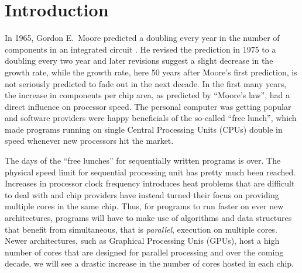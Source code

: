 \documentclass[11pt]{book}
\begin{document}
\chapter{Introduction}
In 1965, Gordon E.\ Moore predicted a doubling every year in the
number of components in an integrated circuit \cite{moore1965}. He
revised the prediction in 1975 to a doubling every two year
\cite{moore1975} and later revisions suggest a slight decrease in the
growth rate, while the growth rate, here 50 years after Moore's first
prediction, is not seriously predicted to fade out in the next
decade. In the first many years, the increase in components per chip
area, as predicted by ``Moore's law'', had a direct influence on
processor speed. The personal computer was getting popular and
software providers were happy beneficials of the so-called ``free
lunch'', which made programs running on single Central Processing
Units (CPUs) double in speed whenever new processors hit the market.

The days of the ``free lunches'' for sequentially written programs is
over. The physical speed limit for sequential processing unit has
pretty much been reached. Increases in processor clock frequency
introduces heat problems that are difficult to deal with and chip
providers have instead turned their focus on providing multiple cores in the
same chip. Thus, for programs to run faster on ever new
architectures, programs will have to make use of algorithms and data
structures that benefit from simultaneous, that is \emph{parallel},
execution on multiple cores. Newer architectures, such as Graphical
Processing Unis (GPUs), host a high number of cores that are designed
for parallel processing and over the coming decade, we will see a
drastic increase in the number of cores hosted in each chip.
\end{document}
